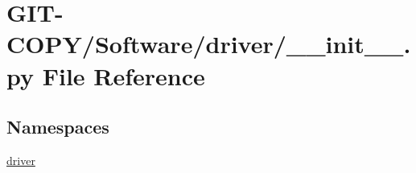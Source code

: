 \hypertarget{GIT-COPY_2Software_2driver_2____init_____8py}{}\section{G\+I\+T-\/\+C\+O\+P\+Y/\+Software/driver/\+\_\+\+\_\+init\+\_\+\+\_\+.py File Reference}
\label{GIT-COPY_2Software_2driver_2____init_____8py}
\subsection*{Namespaces}
\begin{DoxyCompactItemize}
\item 
 \hyperlink{namespacedriver}{driver}
\end{DoxyCompactItemize}
